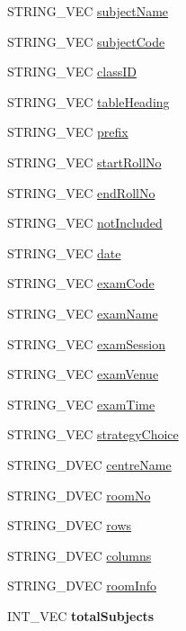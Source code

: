 \begin{DoxyCompactItemize}
S\-T\-R\-I\-N\-G\-\_\-\-V\-E\-C \hyperlink{classInputDetail_a860676e6e8b258a4cf6265e693194e93}{subject\-Name}
\item 
S\-T\-R\-I\-N\-G\-\_\-\-V\-E\-C \hyperlink{classInputDetail_ab391f03f242defb952e24a584eefdb35}{subject\-Code}
\item 
S\-T\-R\-I\-N\-G\-\_\-\-V\-E\-C \hyperlink{classInputDetail_a67c823f91164f534250751ab8da7b7cf}{class\-I\-D}
\item 
S\-T\-R\-I\-N\-G\-\_\-\-V\-E\-C \hyperlink{classInputDetail_a9adc25a6c332855ee0c2dbd5fd71ca86}{table\-Heading}
\item 
S\-T\-R\-I\-N\-G\-\_\-\-V\-E\-C \hyperlink{classInputDetail_af81c2cdf9b1336634bbb33165921d879}{prefix}
\item 
S\-T\-R\-I\-N\-G\-\_\-\-V\-E\-C \hyperlink{classInputDetail_a7262436753ac62bf068cc23b97049f61}{start\-Roll\-No}
\item 
S\-T\-R\-I\-N\-G\-\_\-\-V\-E\-C \hyperlink{classInputDetail_abc3249eab8fbf895620deff0a9349333}{end\-Roll\-No}
\item 
S\-T\-R\-I\-N\-G\-\_\-\-V\-E\-C \hyperlink{classInputDetail_aba862d64d7f84a385e528d0daf42e9fc}{not\-Included}
\item 
S\-T\-R\-I\-N\-G\-\_\-\-V\-E\-C \hyperlink{classInputDetail_a7d1c7ceb33eb86058e00c3a6a68cae4a}{date}
\item 
S\-T\-R\-I\-N\-G\-\_\-\-V\-E\-C \hyperlink{classInputDetail_ac48c0170ce354d3cd188ddc2e83e2c67}{exam\-Code}
\item 
S\-T\-R\-I\-N\-G\-\_\-\-V\-E\-C \hyperlink{classInputDetail_a7b4e4a2a26f23da75d9928601a88a1d9}{exam\-Name}
\item 
S\-T\-R\-I\-N\-G\-\_\-\-V\-E\-C \hyperlink{classInputDetail_a4501d1379c278965497abf21d369ad9e}{exam\-Session}
\item 
S\-T\-R\-I\-N\-G\-\_\-\-V\-E\-C \hyperlink{classInputDetail_a695928668a413ac052776c0b6cb27501}{exam\-Venue}
\item 
S\-T\-R\-I\-N\-G\-\_\-\-V\-E\-C \hyperlink{classInputDetail_a847dd8bb2f0c43960746cfa4d2310a15}{exam\-Time}
\item 
S\-T\-R\-I\-N\-G\-\_\-\-V\-E\-C \hyperlink{classInputDetail_acbdbb6ecb850dec574b5878764c56c88}{strategy\-Choice}
\item 
S\-T\-R\-I\-N\-G\-\_\-D\-V\-E\-C \hyperlink{classInputDetail_a44d0e743d84bfce178975192fc2ddde7}{centre\-Name}
\item 
S\-T\-R\-I\-N\-G\-\_\-D\-V\-E\-C \hyperlink{classInputDetail_a3193354764ba0b44b2eb4b366b4c273a}{room\-No}
\item 
S\-T\-R\-I\-N\-G\-\_\-D\-V\-E\-C \hyperlink{classInputDetail_aa203edbcfd4083624dbc4dc055c1e6e5}{rows}
\item 
S\-T\-R\-I\-N\-G\-\_\-D\-V\-E\-C \hyperlink{classInputDetail_a8563f1b6c4d2e74a9b8421a12585395c}{columns}
\item 
S\-T\-R\-I\-N\-G\-\_\-D\-V\-E\-C \hyperlink{classInputDetail_a7472fa615f318a2553b750529c3a4b0e}{room\-Info}
\item 
\hypertarget{classInputDetail_a09dcf8264ffc09609448e32b0f27bd9a}{I\-N\-T\-\_\-\-V\-E\-C {\bfseries total\-Subjects}}\label{classInputDetail_a09dcf8264ffc09609448e32b0f27bd9a}


\end{DoxyCompactItemize}
